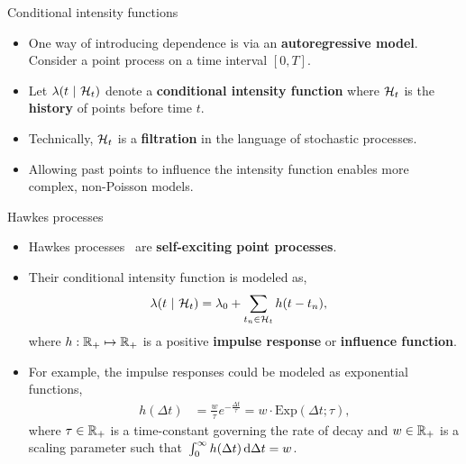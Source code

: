 \documentclass[aspectratio=169]{beamer}
\begin{document}
\begin{frame}{Conditional intensity functions}
\begin{itemize}
    \itemsep1em 
    
    \item One way of introducing dependence is via an \textbf{autoregressive model}. Consider a point process on a time interval $[0, T]$.
    
    \item<2-> Let $\lambda(t ~\vert~ \mathcal{H}_t)$ denote a \textbf{conditional intensity function} where $\mathcal{H}_t$ is the \textbf{history} of points before time $t$. 
    
    \item<3-> Technically, $\mathcal{H}_t$ is a \textbf{filtration} in the language of stochastic processes.
    
    \item<4-> Allowing past points to influence the intensity function enables more complex, non-Poisson models.
\end{itemize}
\end{frame}

\begin{frame}{Hawkes processes}
\begin{itemize}
    \itemsep1em 
    
    \item Hawkes processes~\citep{hawkes1971spectra} are \textbf{self-exciting point processes}.
    
    \item<2-> Their conditional intensity function is modeled as,
    \begin{align}
        \lambda(t ~\vert~ \mathcal{H}_t) &= \lambda_0 + \sum_{t_n \in \mathcal{H}_t} h(t - t_n),
    \end{align}
    where $h: \mathbb{R}_+ \mapsto \mathbb{R}_+$ is a positive \textbf{impulse response} or \textbf{influence function}.
    
    \item<3-> For example, the impulse responses could be modeled as exponential functions,
    \begin{align}
        h(\Delta t) &= \tfrac{w}{\tau} e^{-\tfrac{\Delta t}{\tau}} = w \cdot \mathrm{Exp}(\Delta t; \tau),
    \end{align}
    where $\tau \in \mathbb{R}_+$ is a time-constant governing the rate of decay and $w \in \mathbb{R}_+$ is a scaling parameter such that~$\int_0^\infty h(\Delta t) \mathop{}\!\mathrm{d} \Delta t = w$.
\end{itemize}
\end{frame}
\end{document}

